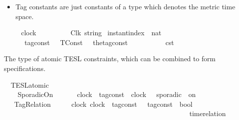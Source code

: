 \begin{isabellebody}
\begin{isamarkuptext}
\begin{itemize}
\item Tag constants are just constants of a type which denotes the metric time space.%
\end{itemize}%
\end{isamarkuptext}\isamarkuptrue%
\isamarkupfalse%
\ \ \ \ \ clock\ \ \ \ \ \ \ \ \ {\isacharequal}\ Clk\ {\isacartoucheopen}string{\isacartoucheclose}\isanewline
{}\isamarkupfalse%
\ instant{\isacharunderscore}index\ {\isacharequal}\ {\isacartoucheopen}nat{\isacartoucheclose}\isanewline
\isanewline
{}\isamarkupfalse%
\ \ \ \ \ {\isacharprime}{\isasymtau}\ tag{\isacharunderscore}const\ {\isacharequal}\ \ TConst\ \ \ {\isacharparenleft}the{\isacharunderscore}tag{\isacharunderscore}const\ {\isacharcolon}\ {\isacharprime}{\isasymtau}{\isacharparenright}\ \ \ \ \ \ \ \ \ {\isacharparenleft}{\isacartoucheopen}{\isasymtau}\isactrlsub c\isactrlsub s\isactrlsub t{\isacartoucheclose}{\isacharparenright}%
\isadelimdocument
%
\endisadelimdocument
%
\isatagdocument
%
\isamarkuptrue%
%
\endisatagdocument
{\isafolddocument}%
%
\isadelimdocument
%
\endisadelimdocument
%
\begin{isamarkuptext}%
The type of atomic TESL constraints, which can be combined to form specifications.%
\end{isamarkuptext}\isamarkuptrue%
\isamarkupfalse%
\ {\isacharprime}{\isasymtau}\ TESL{\isacharunderscore}atomic\ {\isacharequal}\isanewline
\ \ \ \ SporadicOn\ \ \ \ \ \ \ {\isacartoucheopen}clock{\isacartoucheclose}\ {\isacartoucheopen}{\isacharprime}{\isasymtau}\ tag{\isacharunderscore}const{\isacartoucheclose}\ \ {\isacartoucheopen}clock{\isacartoucheclose}\ \ {\isacharparenleft}{\isacartoucheopen}{\isacharunderscore}\ sporadic\ {\isacharunderscore}\ on\ {\isacharunderscore}{\isacartoucheclose}\ {}{}{\isacharparenright}\isanewline
\ \ {\isacharbar}\ TagRelation\ \ \ \ \ \ {\isacartoucheopen}clock{\isacartoucheclose}\ {\isacartoucheopen}clock{\isacartoucheclose}\ {\isacartoucheopen}{\isacharparenleft}{\isacharprime}{\isasymtau}\ tag{\isacharunderscore}const\ {\isasymtimes}\ {\isacharprime}{\isasymtau}\ tag{\isacharunderscore}const{\isacharparenright}\ {\isasymRightarrow}\ bool{\isacartoucheclose}\ \isanewline
\ \ \ \ \ \ \ \ \ \ \ \ \ \ \ \ \ \ \ \ \ \ \ \ \ \ \ \ \ \ \ \ \ \ \ \ \ \ \ \ \ \ \ \ \ \ \ \ \ \ \ \ \ \ {\isacharparenleft}{\isacartoucheopen}time{\isacharminus}relation\ {\isasymlfloor}{\isacharunderscore}{\isacharcomma}\ {\isacharunderscore}{\isasymrfloor}\ {\isasymin}\ {\isacharunderscore}{\isacartoucheclose}\ {}{}{\isacharparenright}\isanewline

\end{isabellebody}
